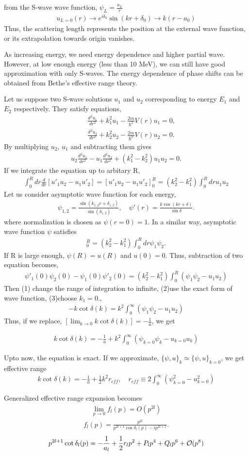 \documentclass[10pt]{book}
\newcommand{\bea}{\begin{eqnarray}}
\newcommand{\eea}{\end{eqnarray}}
\newcommand{\no}{\nonumber \\}
\begin{document}
from the S-wave wave function, $\psi_L=\frac{u_L}{r}$
\bea 
u_{L=0}(r)\to e^{i\delta_0}\sin(kr+\delta_0)\to k (r-a_0)
\eea 
Thus, the scattering length represents the position at the external wave function,
or its extrapolation towards origin vanishes. 


As increasing energy, we need energy dependence and higher partial wave. 
However, at low enough energy (less than 10 MeV), we can still have
good approximation with only S-waves. The energy dependence of phase 
shifts can be obtained from Bethe's effective range theory.

Let us suppose two S-wave solutions $u_1$ and $u_2$ corresponding to energy $E_1$
and $E_2$ respectively. They satisfy equations,
\bea
& &\frac{d^2 u_1}{dr^2}+k_1^2 u_1-\frac{2m}{\hbar^2}V(r)u_1=0,\no 
& &\frac{d^2 u_2}{dr^2}+k_2^2 u_2-\frac{2m}{\hbar^2}V(r)u_2=0.
\eea 
By multiplying $u_{2}$, $u_1$ and subtracting them gives
\bea 
u_2\frac{d^2 u_1}{dr^2}- u_1\frac{d^2 u_2}{dr^2}
+(k_1^2-k_2^2)u_1 u_2 =0.
\eea 
If we integrate the equation up to arbitary R,
\bea 
\int_0^R dr \frac{d}{dr}[u'_1 u_2-u_1 u'_2] =[u'_1 u_2-u_1 u'_2]_0^R
=(k_2^2-k_1^2)\int_0^R dr u_1 u_2
\eea 
Let us consider asymptotic wave function for each energy,
\bea 
\psi_{1,2}=\frac{\sin(k_{1,2} r+\delta_{1,2})}{\sin(\delta_{1,2})},
\quad \psi'(r)=\frac{k \cos(kr+\delta)}{\sin\delta}.
\eea 
where normalization is chosen as $\psi(r=0)=1$.
In a similar way, asymptotic wave function $\psi$ satisfies 
\bea 
[\psi'_1 \psi_2-\psi_1 \psi'_2]_0^R
=(k_2^2-k_1^2)\int_0^R dr \psi_1 \psi_2.
\eea 
If R is large enough, $\psi(R)=u(R)$
and $u(0)=0$. 
Thus, subtraction of two equation becomes,
\bea 
\psi'_1(0)\psi_2(0)-\psi_1(0)\psi'_2(0)
=(k_2^2-k_1^2)\int_0^R (\psi_1\psi_2-u_1 u_2)
\eea 
Then (1) change the range of integration to infinite, 
(2)use the exact form of wave function, (3)choose $k_1=0$.,
\bea 
[\lim_{k\to 0} k\cot\delta(k)]-k\cot\delta(k)
=k^2\int_0^\infty (\psi_1\psi_2-u_1 u_2)
\eea  
Thus, if we replace, $[\lim_{k\to 0} k\cot\delta(k)]=-\frac{1}{a}$, we get

\bea 
\boxed{ 
k\cot\delta(k)=-\frac{1}{a}+k^2\int_0^\infty 
   (\psi_{k=0} \psi_k-u_{k=0} u_k )
}
\eea 

Upto now, the equation is exact. 
If we approximate, $\{\psi,u\}_k\simeq \{\psi,u \}_{k=0} $, we get effective range
\bea 
k\cot\delta(k)=-\frac{1}{a}+\frac{1}{2}k^2 r_{eff}, \quad 
r_{eff}\equiv 2 \int_0^\infty (\psi_{k=0}^2 -u_{k=0}^2) 
\eea   

Generalized effective range expansion becomes
\bea 
\lim_{p\to 0} f_l(p)=O(p^{2l})
\eea 
\bea 
f_l(p)=\frac{p^{2l}}{p^{2l+1}\cos\delta_l(p)-i p^{2l+1}}.
\eea 
\bea 
p^{2l+1}\cot\delta_l(p)=-\frac{1}{a_l}+\frac{1}{2}r_l p^2+P_l p^4+Q_l p^6+{\cal O}(p^8)
\eea 
\end{document}
